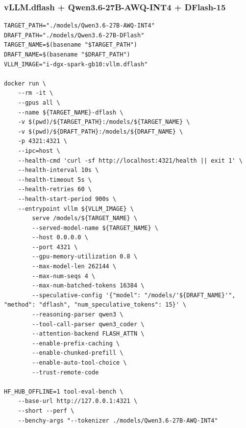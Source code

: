 \documentclass{article}
\begin{document}
\subsubsection{vLLM.dflash + Qwen3.6-27B-AWQ-INT4 + DFlash-15}
\begin{lstlisting}
TARGET_PATH="./models/Qwen3.6-27B-AWQ-INT4"
DRAFT_PATH="./models/Qwen3.6-27B-DFlash"
TARGET_NAME=$(basename "$TARGET_PATH")
DRAFT_NAME=$(basename "$DRAFT_PATH")
VLLM_IMAGE="i-dgx-spark-gb10:vllm.dflash"

docker run \
    --rm -it \
    --gpus all \
    --name ${TARGET_NAME}-dflash \
    -v $(pwd)/${TARGET_PATH}:/models/${TARGET_NAME} \
    -v $(pwd)/${DRAFT_PATH}:/models/${DRAFT_NAME} \
    -p 4321:4321 \
    --ipc=host \
    --health-cmd 'curl -sf http://localhost:4321/health || exit 1' \
    --health-interval 10s \
    --health-timeout 5s \
    --health-retries 60 \
    --health-start-period 900s \
    --entrypoint vllm ${VLLM_IMAGE} \
        serve /models/${TARGET_NAME} \
        --served-model-name ${TARGET_NAME} \
        --host 0.0.0.0 \
        --port 4321 \
        --gpu-memory-utilization 0.8 \
        --max-model-len 262144 \
        --max-num-seqs 4 \
        --max-num-batched-tokens 16384 \
        --speculative-config '{"model": "/models/'${DRAFT_NAME}'", "method": "dflash", "num_speculative_tokens": 15}' \
        --reasoning-parser qwen3 \
        --tool-call-parser qwen3_coder \
        --attention-backend FLASH_ATTN \
        --enable-prefix-caching \
        --enable-chunked-prefill \
        --enable-auto-tool-choice \
        --trust-remote-code

HF_HUB_OFFLINE=1 tool-eval-bench \
    --base-url http://127.0.0.1:4321 \
    --short --perf \
    --benchy-args "--tokenizer ./models/Qwen3.6-27B-AWQ-INT4"
\end{lstlisting}
\end{document}
